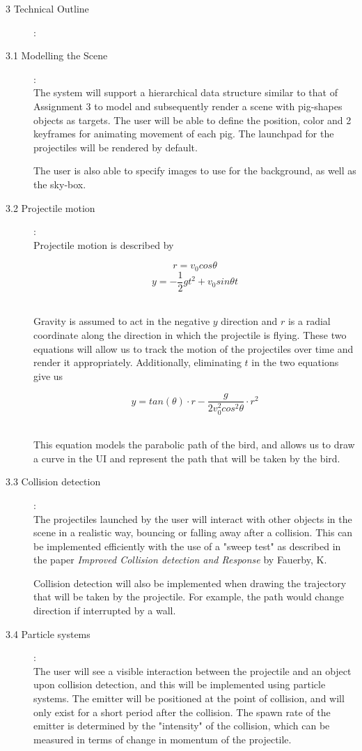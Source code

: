\documentclass {article}
\begin{document}
\begin{description}
\begin{enumerate}
\end{enumerate}

\newpage
\item[3 Technical Outline]:
\item[3.1 Modelling the Scene]: \\
The system will support a hierarchical data structure similar to that of Assignment 3 to model and subsequently render a scene with pig-shapes objects as targets. The user will be able to define the position, color and 2 keyframes for animating movement of each pig. The launchpad for the projectiles will be rendered by default. \medskip

The user is also able to specify images to use for the background, as well as the sky-box. \medskip

\item[3.2 Projectile motion]: \\
Projectile motion is described by \medskip

\[
	r = v_0cos \theta
\]
\[
	y = -\frac{1}{2}gt^2 + v_0 sin \theta t
\] \

Gravity is assumed to act in the negative $y$ direction and $r$ is a radial coordinate along the direction in which the projectile is flying. These two equations will allow us to track the motion of the projectiles over time and render it appropriately. Additionally, eliminating $t$ in the two equations give us \medskip

\[
	y = tan(\theta)\cdot r - \frac{g}{2v_0^2cos^2\theta}\cdot r^2
\] \

This equation models the parabolic path of the bird, and allows us to draw a curve in the UI and represent the path that will be taken by the bird. \medskip

\item[3.3 Collision detection]: \\
The projectiles launched by the user will interact with other objects in the scene in a realistic way, bouncing or falling away after a collision. This can be implemented efficiently with the use of a "sweep test" as described in the paper {\it Improved Collision detection and Response} by Fauerby, K. \medskip

Collision detection will also be implemented when drawing the trajectory that will be taken by the projectile. For example, the path would change direction if interrupted by a wall. \medskip

\item[3.4 Particle systems]: \\
The user will see a visible interaction between the projectile and an object upon collision detection, and this will be implemented using particle systems. The emitter will be positioned at the point of collision, and will only exist for a short period after the collision. The spawn rate of the emitter is determined by the "intensity" of the collision, which can be measured in terms of change in momentum of the projectile. \medskip


\end{description}
\end{document}
